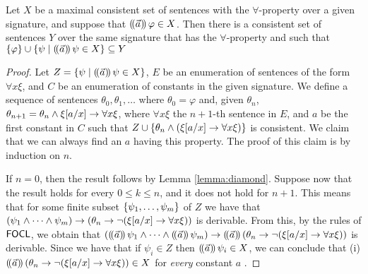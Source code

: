 \documentclass[sigconf,anonymous]{aamas}
\begin{document}
\begin{lemma}
\label{lemma:lindy}
   Let $X$ be a maximal consistent set of sentences with the $\forall$-property over a given signature, and suppose that $(\!( \vec{a} )\!)\, \varphi \in X$.  Then there is a consistent set of sentences $Y$ over the same signature that has the $\forall$-property and such that $\{\varphi\}\cup \{\psi\mid (\!( \vec{a} )\!)\,\psi\in X\}\subseteq Y$
\end{lemma}
\begin{proof}
Let $Z=\{\psi \mid (\!( \vec{a} )\!)\, \psi \in X\}$,
$E$ be an enumeration of sentences of the form $\forall x \xi$, and $C$ be an enumeration of constants in the given signature. 
We define a sequence of sentences $\theta_0,\theta_1,\ldots$ where $\theta_0= \varphi$ and, given $\theta_n$, $\theta_{n+1} = \theta_n \land \xi[a/x]\to \forall x \xi $, where $\forall x \xi$ the $n+1$-th sentence in $E$, and $a$ be the first constant in  $C$  such that $Z\cup \{\theta_n \land (\xi[a/x]\to \forall x \xi )\}$ is consistent. We claim that we can always find an $a$ having this property. The proof of this claim is by induction on  $n$. 

If $n=0$, then the result follows by Lemma \ref{lemma:diamond}. Suppose now that the result holds for every $0\leq k \leq n$, and it does not hold for $n+1$. This means that for some finite subset $\{\psi_1,\ldots,\psi_m \}$ of $Z$ we have that $ (\psi_1 \land \cdots \land \psi_m) \to (\theta_n \to \neg (\xi[a/x]\to \forall x \xi )) $ is derivable. From this, by the rules of $\mathsf{FOCL}$, we obtain that $((\!( \vec{a} )\!)\,\psi_1 \land \cdots \land (\!( \vec{a} )\!)\,\psi_m) \to (\!( \vec{a} )\!)\,(\theta_n \to \neg (\xi[a/x]\to \forall x \xi )) $ is derivable. Since we have that if $\psi_i\in Z$ then $(\!( \vec{a} )\!)\,\psi_i  \in X$, we can conclude that (i) $(\!( \vec{a} )\!)\,(\theta_n \to \neg (\xi[a/x]\to \forall x \xi ))\in X$ for \emph{every} constant $a$ . 


\end{proof}
\end{document}
